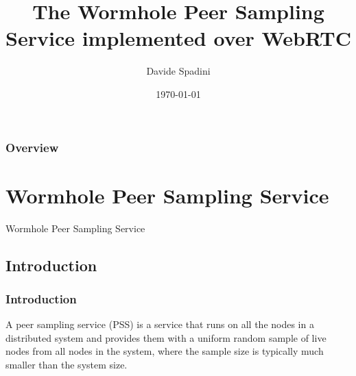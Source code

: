 \documentclass{beamer}
\title[WPSS implemented over WebRTC]{The Wormhole Peer Sampling Service implemented over WebRTC} %
\author{Davide Spadini} %
\institute[Unitn] %
{
University of Trento \\ %
\medskip
\textit{davide.spadini@studenti.unitn.it} %
}
\date{\today} %
\begin{document}
\begin{frame}
\titlepage %
\end{frame}

\begin{frame}
\frametitle{Overview} %
\tableofcontents %
\end{frame}


\section{Wormhole Peer Sampling Service} %
\begin{frame}[c]
\Huge{\centerline{Wormhole Peer Sampling Service}}

\end{frame}

\subsection{Introduction}

\begin{frame}
\frametitle{Introduction}
A peer sampling service (PSS) is a service that runs on all the nodes in a distributed system and provides them with a uniform random sample of live nodes from all nodes in the system, where the sample size is typically much smaller than the system size. 
\end{frame}
\end{document}
